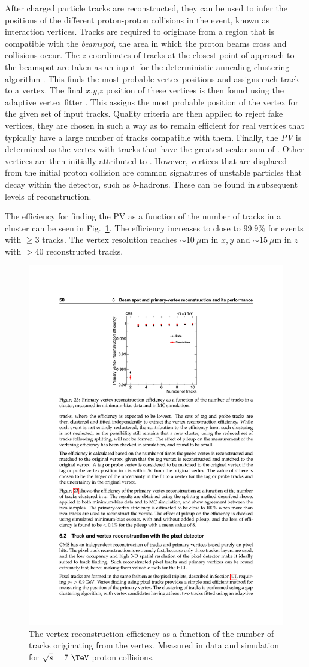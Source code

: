 After charged particle tracks are reconstructed, they can be used to
infer the positions of the different proton-proton collisions in the
event, known as interaction vertices. Tracks are required to originate
from a region that is compatible with the \LHC \emph{beamspot}, the area
in which the proton beams cross and collisions occur. The
$z$-coordinates of tracks at the closest point of approach to the
beamspot are taken as an input for the deterministic annealing
clustering algorithm \cite{726788:DA}. This finds the most probable
vertex positions and assigns each track to a vertex. The final
$x$,$y$,$z$ position of these vertices is then found using the
adaptive vertex fitter \cite{Waltenberger:2008zz}. This assigns the
most probable position of the vertex for the given set of input
tracks. Quality criteria are then applied to reject fake vertices,
they are chosen in such a way as to remain efficient for real vertices
that typically have a large number of tracks compatible with them.
Finally, the \emph{\ac{PV}} is determined as the vertex with
tracks that have the greatest scalar sum of \pt. Other vertices are
then initially attributed to \PU.  However, vertices that are
displaced from the initial proton collision are common signatures of
unstable particles that decay within the detector, such as
$b$-hadrons. These can be found in subsequent levels of
reconstruction.

The efficiency for finding the \ac{PV} as a function of the
number of tracks in a cluster can be seen in
Fig.~\ref{fig:vertex_reco}. The efficiency increases to close to
$99.9\%$ for events with $\ge 3$ tracks. The vertex resolution reaches
$\sim10~\mu$m in $x,y$ and $\sim15~\mu$m in $z$ with $>40$
reconstructed tracks.

\begin{figure}
\begin{center}
\includegraphics[width=0.5\linewidth]{figs/reconstruction/vertexPerformance} \end{center}
\caption{ The vertex reconstruction efficiency as a function of the
number of tracks originating from the vertex. Measured in data and
simulation for $\sqrt{s}=7~\tev$ proton collisions.
\cite{Chatrchyan:2014fea}}
\label{fig:vertex_reco} \end{figure}


